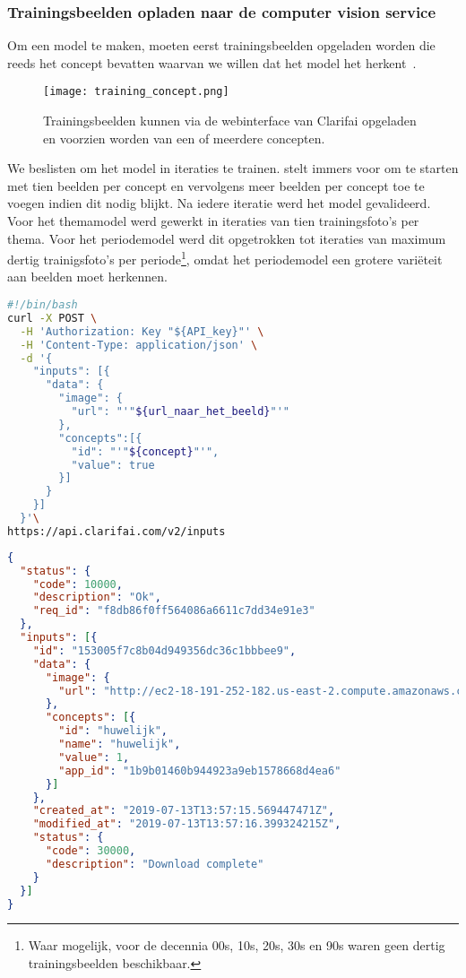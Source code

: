 \subsubsection{Trainingsbeelden opladen naar de computer vision service}
\label{subsubsec:trainingsbeelden-opladen}

Om een model te maken, moeten eerst trainingsbeelden opgeladen worden die reeds het concept bevatten waarvan we willen dat het model het herkent~\autocite{ClarifaiAPI}. 

\begin{figure}[h]
	\centering
	\texttt{[image: training\_concept.png]}\hfill
	\caption[Trainingsbeelden toevoegen via de webinterface]{Trainingsbeelden kunnen via de webinterface van Clarifai opgeladen en voorzien worden van een of meerdere concepten.}
	\label{fig:trainingsbeelden-toevoegen}
\end{figure}

We beslisten om het model in iteraties te trainen. \textcite{ClarifaiAPI} stelt immers voor om te starten met tien beelden per concept en vervolgens meer beelden per concept toe te voegen indien dit nodig blijkt. Na iedere iteratie werd het model gevalideerd. Voor het themamodel werd gewerkt in iteraties van tien trainingsfoto’s per thema. Voor het periodemodel werd dit opgetrokken tot iteraties van maximum dertig trainigsfoto’s per periode\footnote{Waar mogelijk, voor de decennia 00s, 10s, 20s, 30s en 90s waren geen dertig trainingsbeelden beschikbaar.}, omdat het periodemodel een grotere variëteit aan beelden moet herkennen.

\begin{lstlisting}[language=bash,caption={bash commando om een beeld met een concept naar Clarifai op te laden.}]
#!/bin/bash
curl -X POST \
  -H 'Authorization: Key "${API_key}"' \
  -H 'Content-Type: application/json' \
  -d '{
    "inputs": [{
      "data": {
        "image": {
          "url": "'"${url_naar_het_beeld}"'"
        },
        "concepts":[{
          "id": "'"${concept}"'",
          "value": true
        }]
      }
    }]
  }'\
https://api.clarifai.com/v2/inputs
\end{lstlisting}

\begin{lstlisting}[language=json,caption={Het antwoord van de Computer Vision API in JSON na het opladen van een beeld met een concept}]
{
  "status": {
    "code": 10000,
    "description": "Ok",
    "req_id": "f8db86f0ff564086a6611c7dd34e91e3"
  },
  "inputs": [{
    "id": "153005f7c8b04d949356dc36c1bbbee9",
    "data": {
      "image": {
        "url": "http://ec2-18-191-252-182.us-east-2.compute.amazonaws.com:8182/iiif/2/2003-036-018/full/922,/0/default.jpg"
      },
      "concepts": [{
        "id": "huwelijk",
        "name": "huwelijk",
        "value": 1,
        "app_id": "1b9b01460b944923a9eb1578668d4ea6"
      }]
    },
    "created_at": "2019-07-13T13:57:15.569447471Z",
    "modified_at": "2019-07-13T13:57:16.399324215Z",
    "status": {
      "code": 30000,
      "description": "Download complete"
    }
  }]
}
\end{lstlisting}


